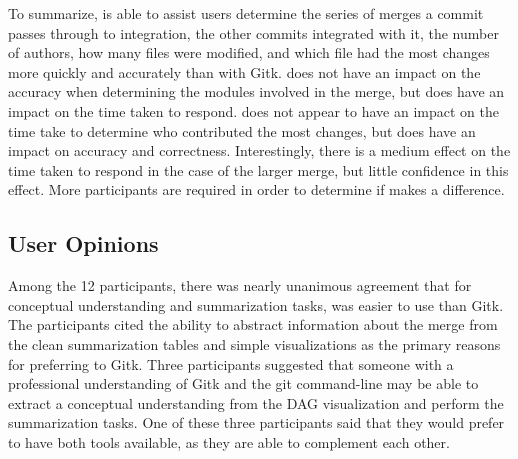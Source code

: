 To summarize, \tool{} is able to assist users determine the series of
merges a commit passes through to integration, the other commits
integrated with it, the number of authors, how many files were modified,
and which file had the most changes more quickly and accurately than
with Gitk. \tool{} does not have an impact on the accuracy when
determining the modules involved in the merge, but does have an impact
on the time taken to respond. \tool{} does not appear to have an impact
on the time take to determine who contributed the most changes, but does
have an impact on accuracy and correctness. Interestingly, there is a
medium effect on the time taken to respond in the case of the larger
merge, but little confidence in this effect. More participants are
required in order to determine if \tool{} makes a difference.

\subsection{User Opinions}
\label{sub:user_opinions_results}

Among the 12 participants, there was nearly unanimous agreement that for
conceptual understanding and summarization tasks, \tool{} was easier to
use than Gitk. The participants cited the ability to abstract
information about the merge from the clean summarization tables and
simple visualizations as the primary reasons for preferring \tool{} to
Gitk. Three participants suggested that someone with a professional
understanding of Gitk and the git command-line may be able to extract a
conceptual understanding from the DAG visualization and perform the
summarization tasks. One of these three participants said that they
would prefer to have both tools available, as they are able to
complement each other.

